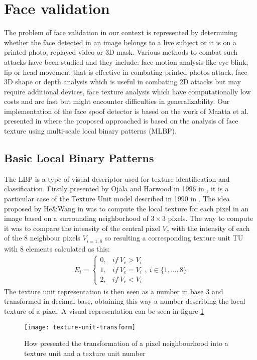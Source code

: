 \section{Face validation}
The problem of face validation in our context is represented by determining whether the face detected in an image belongs to a live subject or it is on a printed photo, replayed video or 3D mask. Various methods to combat such attacks have been studied and they include: face motion analysis \cite{BharadwajDVS13, PanSWL07, TirunagariPWISH15} like eye blink, lip or head movement that is effective in combating printed photos attack, face 3D shape or depth analysis \cite{MarsicoNRD12, LagorioTCFS13} which is useful in combating 2D attacks but may require additional devices, face texture analysis \cite{MaattaHP11} which have computationally low costs and are fast but might encounter difficulties in generalizability. Our implementation of the face spoof detector is based on the work of Maatta et al. presented in \cite{MaattaHP11} where the proposed approached is based on the analysis of face texture using multi-scale local binary patterns (MLBP).
\subsection{Basic Local Binary Patterns}
The LBP is a type of visual descriptor used for texture identification and classification. Firstly presented by Ojala and Harwood in 1996 in \cite{ojala1996comparative}, it is a particular case of the Texture Unit model described in 1990 in \cite{HeWang90}. The idea proposed by He\&Wang in \cite{HeWang90} was to compute the local texture for each pixel in an image based on a surrounding neighborhood of $3\times3$ pixels. The way to compute it was to compare the intensity of the central pixel $V_c$ with the intensity of each of the 8 neighbour pixels $V_{i=\overline{1,8}}$ so resulting a corresponding texture unit TU with 8 elements calculated as this:
\begin{align}
	E_i = \begin{cases}
	0, & if\ V_c > V_i \\
	1, & if\ V_c = V_i \\
	2, & if\ V_c < V_i
	\end{cases}, \ i \in \{1,...,8\}
\end{align}
The texture unit representation is then seen as a number in base 3 and transformed in decimal base, obtaining this way a number describing the local texture of a pixel.
A visual representation can be seen in figure \ref{visual-texture-unit}
\begin{figure}[h]
	\begin{center}
		\texttt{[image: texture-unit-transform]}
		\caption[Visual representation of texture unit transform]{How \cite{HeWang90} presented the transformation of a pixel neighbourhood into a texture unit and a texture unit number}
	\end{center}
	\label{visual-texture-unit}
\end{figure}

